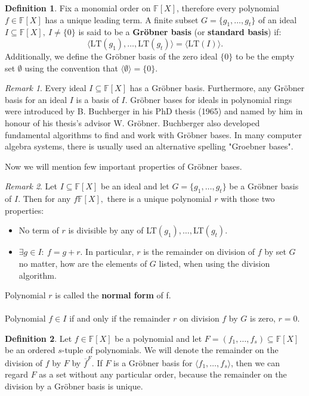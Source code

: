 \documentclass[thesis=M,english]{FITthesis}[2012/10/20]
\theoremstyle{remark}
\newtheorem*{RM}{Remark}
\theoremstyle{definition}
\newtheorem{DF}{Definition}[section]
\begin{document}
\begin{DF}
Fix a monomial order on $\mathbb{F}[X]$, therefore every polynomial $f \in \mathbb{F}[X]$ has a unique leading term. A finite subset $G = \{g_1, \ldots, g_t \}$ of an ideal $I \subseteq \mathbb{F}[X],\ I \neq \{ 0 \}$ is said to be a \textbf{Gröbner basis} (or \textbf{standard basis}) if:
$$
\langle \text{LT}(g_1), \ldots, \text{LT}(g_t) \rangle = \langle \text{LT}(I) \rangle.
$$
Additionally, we define the Gröbner basis of the zero ideal $\{0\}$ to be the empty set $\emptyset$ using the convention that $\langle \emptyset \rangle = \{0\}.$
\end{DF}
\begin{RM}
Every ideal $I \subseteq \mathbb{F}[X]$ has a Gröbner basis. Furthermore, any Gröbner basis for an ideal $I$ is a basis of $I$. Gröbner bases for ideals in polynomial rings were introduced by B. Buchberger in his PhD thesis (1965) \cite{bruno} and named by him in honour of his thesis's advisor W. Gröbner. Buchberger also developed fundamental algorithms to find and work with Gröbner bases. In many computer algebra systems, there is usually used an alternative spelling "Groebner bases".
\end{RM}
\phantom{.}
\phantom{.}
\noindent Now we will mention few important properties of Gröbner bases.
\begin{RM}
Let $I \subseteq \mathbb{F}[X]$ be an ideal and let $G = \{g_1, \ldots, g_t\}$ be a Gröbner basis of $I$. Then for any $f \mathbb{F}[X],$ there is a unique polynomial $r$ with those two properties:
\begin{itemize}
\item No term of $r$ is divisible by any of LT$(g_1),\ldots,$LT$(g_t)$.
\item $\exists g \in I:\ f = g + r.$
In particular, $r$ is the remainder on division of $f$ by set $G$ no matter, how are the elements of $G$ listed, when using the division algorithm. 
\end{itemize}
Polynomial $r$ is called the \textbf{normal form} of f. \\ \\ 
\noindent Polynomial $f \in I$ if and only if the remainder $r$ on division $f$ by $G$ is zero, $r = 0.$
\end{RM}
\begin{DF}
Let $f \in \mathbb{F}[X]$ be a polynomial and let $F = (f_1, \ldots, f_s) \subseteq \mathbb{F}[X]$ be an ordered $s$-tuple of polynomials. We will denote the remainder on the division of $f$ by $F$ by $\overline{f}^F$. If $F$ is a Gröbner basis for $\langle f_1, \ldots, f_s \rangle$, then we can regard $F$ as a set without any particular order, because the remainder on the division by a Gröbner basis is unique.
\end{DF}
\end{document}
